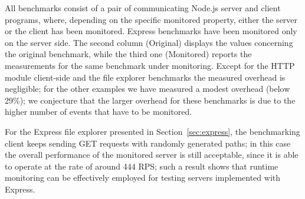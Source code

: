 All benchmarks consist of a pair of communicating Node.js server and client programs, where, depending on the specific
monitored property, either the server or the client has been monitored. Express benchmarks have been monitored only on the server side. 
The second column (Original) displays the values concerning the original benchmark, while the third one
(Monitored) reports the measurements for the same benchmark under monitoring.
Except for the HTTP module client-side and the file explorer benchmarks the measured overhead is negligible;
for the other examples we have measured a modest overhead (below 29\%); we conjecture that the larger overhead
for these benchmarks is due to the higher number of events that have to be monitored.

For the Express file explorer presented in Section~\ref{sec:express}, the benchmarking client keeps sending GET requests
with randomly generated paths; in this case the overall performance of the monitored server
is still acceptable, since it is able to operate at the rate of around 444 RPS; such a result shows that runtime monitoring can be effectively
employed for testing servers implemented with Express.
